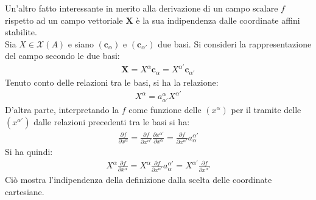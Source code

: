      {Un'altro fatto interessante in merito alla derivazione di un campo scalare $f$ rispetto ad un campo vettoriale $\mathbf{X}$ è la sua indipendenza dalle coordinate affini stabilite.\\
    Sia $X\in \mathcal{X}(A)$ e siano $(\mathbf{c}_\alpha)$ e $(\mathbf{c}_{\alpha'})$ due basi. Si consideri la rappresentazione del campo secondo le due basi:
    \begin{align*}
        \mathbf{X}=X^\alpha\mathbf{c}_\alpha =X^{\alpha'}\mathbf{c}_{\alpha'}
    \end{align*}
    Tenuto conto delle relazioni tra le basi, si ha la relazione:
    \begin{align*}
        X^\alpha=a^\alpha_{\alpha'}X^{\alpha'}
    \end{align*}
    D'altra parte, interpretando la $f$ come funzione delle $(x^\alpha)$ per il tramite delle $(x^{\alpha'})$ dalle relazioni precedenti tra le basi si ha:
    \begin{align*}
        \frac{\partial f}{\partial x^\alpha}=\frac{\partial f}{\partial x^{\alpha'}}\frac{\partial x^{\alpha'} }{\partial x^\alpha}=\frac{\partial f}{\partial x^{\alpha'}}a^{\alpha'}_\alpha
    \end{align*}
    Si ha quindi:
    \begin{align*}
        X^\alpha\frac{\partial f}{\partial x^\alpha}=X^\alpha\frac{\partial f}{\partial x^{\alpha'}}a^{\alpha'}_\alpha= X^{\alpha'}\frac{\partial f}{\partial x^{\alpha'}}
    \end{align*}
    Ciò mostra l'indipendenza della definizione dalla scelta delle coordinate cartesiane.}{}{}
